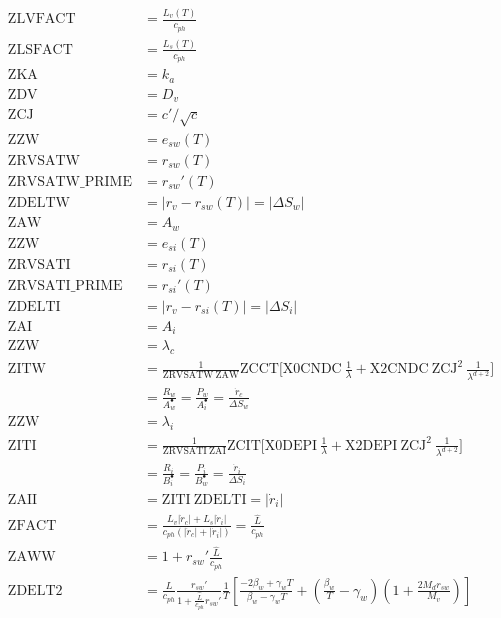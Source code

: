 {\begingroup
\allowdisplaybreaks
\begin{align}
 \mathrm{ZLVFACT} &= \frac{L_v(T)}{c_{ph}} \\
 \mathrm{ZLSFACT} &= \frac{L_s(T)}{c_{ph}} \\
 \mathrm{ZKA} &= k_a \\
 \mathrm{ZDV} &= D_v \\
 \mathrm{ZCJ} &= c'/\sqrt c \\
 \mathrm{ZZW} &= e_{sw}(T) \\
 \mathrm{ZRVSATW} &= r_{sw}(T) \\
 \mathrm{ZRVSATW\_PRIME} &= r_{sw}'(T) \\
 \mathrm{ZDELTW} &= |r_v - r_{sw}(T)| = |\Delta S_w| \\
 \mathrm{ZAW} &= A_w \\
 \mathrm{ZZW} &= e_{si}(T) \\
 \mathrm{ZRVSATI} &= r_{si}(T) \\
 \mathrm{ZRVSATI\_PRIME} &= r_{si}'(T) \\
 \mathrm{ZDELTI} &= |r_v - r_{si}(T)| = |\Delta S_i| \\
 \mathrm{ZAI} &= A_i \\
 \mathrm{ZZW} &= \lambda_c \\
 \mathrm{ZITW} &= \frac{1}{\mathrm{ZRVSATW} ~ \mathrm{ZAW}} \mathrm{ZCCT} \bigg[\mathrm{X0CNDC} ~ \frac{1}{\lambda} + \mathrm{X2CNDC} ~ \mathrm{ZCJ}^2 ~ \frac{1}{\lambda^{d+2}}\bigg]  \\ 
 &= \frac{R_w}{A_w^\bullet} = \frac{P_w}{A_i^\bullet} = \frac{\dot{r}_c}{\Delta S_w} \\
 \mathrm{ZZW} &= \lambda_i \\
 \mathrm{ZITI} &= \frac{1}{\mathrm{ZRVSATI} ~ \mathrm{ZAI}} \mathrm{ZCIT} \bigg[\mathrm{X0DEPI} ~ \frac{1}{\lambda} + \mathrm{X2DEPI} ~ \mathrm{ZCJ}^2 ~ \frac{1}{\lambda^{d+2}}\bigg]  \\ 
 &= \frac{R_i}{B_i^\bullet} = \frac{P_i}{B_w^\bullet} = \frac{\dot{r}_i}{\Delta S_i} \\
 \mathrm{ZAII} &= \mathrm{ZITI} ~ \mathrm{ZDELTI} = |\dot{r}_i| \\
 \mathrm{ZFACT} &= \frac{L_v |\dot{r}_c| + L_s |\dot{r}_i|}{c_{ph} (|\dot{r}_c| + |\dot{r}_i|)} = \frac{\hat{L}}{c_{ph}} \\
 \mathrm{ZAWW} &= 1 + r_{sw}' \frac{\hat{L}}{c_{ph}} \\
 \mathrm{ZDELT2} &= \frac{\hat{L}}{c_{ph}} \frac{r_{sw}'}{1 + \frac{\hat{L}}{c_{ph}} r_{sw}'} \frac{1}{T} \left[ \frac{-2 \beta_w + \gamma_w T}{\beta_w - \gamma_w T} + \left( \frac{\beta_w}{T} - \gamma_w \right) \left( 1 + \frac{2 M_d r_{sw}}{M_v} \right)\right] \\

\end{align}}
